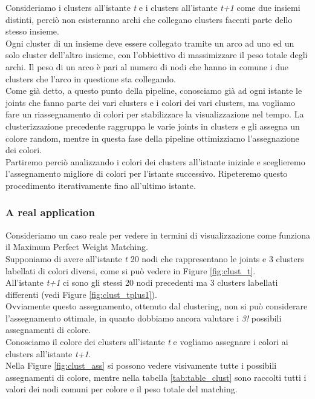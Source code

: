 Consideriamo i clusters all'istante \textit{t} e i clusters all'istante \textit{t+1} come due insiemi distinti, perciò non esisteranno archi che collegano clusters facenti parte dello stesso insieme. \\
Ogni cluster di un insieme deve essere collegato tramite un arco ad uno ed un solo cluster dell'altro insieme, con l'obbiettivo di massimizzare il peso totale degli archi.
Il peso di un arco è pari al numero di nodi che hanno in comune i due clusters che l'arco in questione sta collegando. \\
Come già detto, a questo punto della pipeline, conosciamo già ad ogni istante le joints che fanno parte dei vari clusters e i colori dei vari clusters, ma vogliamo fare un riassegnamento di colori per stabilizzare la visualizzazione nel tempo.
La clusterizzazione precedente raggruppa le varie joints in clusters e gli assegna un colore random, mentre in questa fase della pipeline ottimizziamo l'assegnazione dei colori. \\
Partiremo perciò analizzando i colori dei clusters all'istante iniziale e sceglieremo l'assegnamento migliore di colori per l'istante successivo.
Ripeteremo questo procedimento iterativamente fino all'ultimo istante.


\subsubsection{A real application}
Consideriamo un caso reale per vedere in termini di visualizzazione come funziona il Maximum Perfect Weight Matching. \\
Supponiamo di avere all'istante \textit{t} 20 nodi che rappresentano le joints e 3 clusters labellati di colori diversi, come si può vedere in Figure \ref{fig:clust_t}. \\
All'istante \textit{t+1} ci sono gli stessi 20 nodi precedenti ma 3 clusters labellati differenti (vedi Figure \ref{fig:clust_tplus1}).  \\
Ovviamente questo assegnamento, ottenuto dal clustering, non si può considerare l'assegnamento ottimale, in quanto dobbiamo ancora valutare i \textit{3!} possibili assegnamenti di colore. \\
Conosciamo il colore dei clusters all'istante  \textit{t} e vogliamo assegnare i colori ai clusters all'istante \textit{t+1}.\\
Nella Figure \ref{fig:clust_ass} si possono vedere visivamente tutte i possibili assegnamenti di colore, mentre nella tabella \ref{tab:table_clust} sono raccolti tutti i valori dei nodi comuni per colore e il peso totale del matching.

